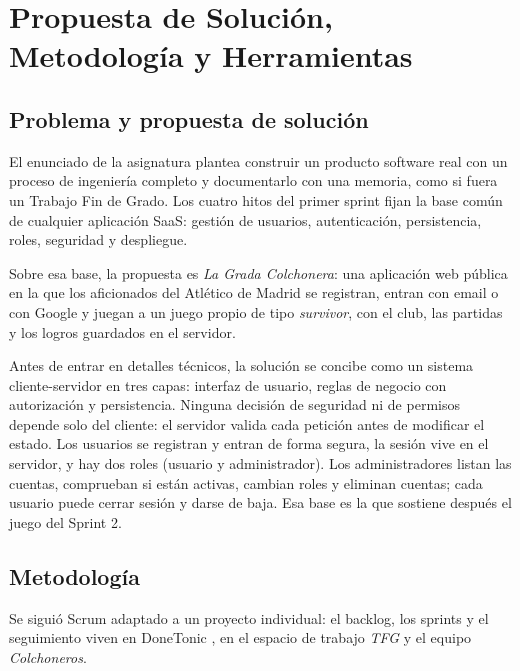 \chapter{Propuesta de Solución, Metodología y Herramientas}
\label{cap:propuesta}

\section{Problema y propuesta de solución}

El enunciado de la asignatura \cite{enunciado} plantea construir un producto software real con un proceso de ingeniería completo y documentarlo con una memoria, como si fuera un Trabajo Fin de Grado. Los cuatro hitos del primer sprint fijan la base común de cualquier aplicación SaaS: gestión de usuarios, autenticación, persistencia, roles, seguridad y despliegue.

Sobre esa base, la propuesta es \textit{La Grada Colchonera}: una aplicación web pública en la que los aficionados del Atlético de Madrid se registran, entran con email o con Google y juegan a un juego propio de tipo \textit{survivor}, con el club, las partidas y los logros guardados en el servidor.

Antes de entrar en detalles técnicos, la solución se concibe como un sistema cliente-servidor en tres capas: interfaz de usuario, reglas de negocio con autorización y persistencia. Ninguna decisión de seguridad ni de permisos depende solo del cliente: el servidor valida cada petición antes de modificar el estado. Los usuarios se registran y entran de forma segura, la sesión vive en el servidor, y hay dos roles (usuario y administrador). Los administradores listan las cuentas, comprueban si están activas, cambian roles y eliminan cuentas; cada usuario puede cerrar sesión y darse de baja. Esa base es la que sostiene después el juego del Sprint 2.

\section{Metodología}

Se siguió Scrum \cite{scrumguide} adaptado a un proyecto individual: el backlog, los sprints y el seguimiento viven en DoneTonic \cite{donetonic}, en el espacio de trabajo \textit{TFG} y el equipo \textit{Colchoneros}.

